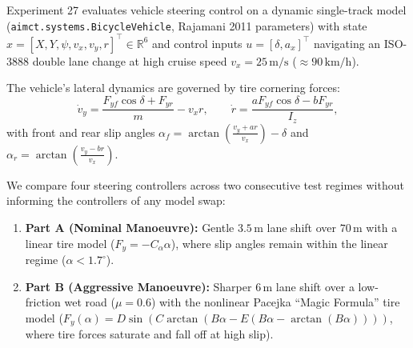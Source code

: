 \documentclass[11pt,a4paper]{article}
\begin{document}
Experiment 27 evaluates vehicle steering control on a dynamic single-track model (\texttt{aimct.systems.BicycleVehicle}, Rajamani 2011 parameters) with state $x = [X, Y, \psi, v_x, v_y, r]^\top \in \mathbb{R}^6$ and control inputs $u = [\delta, a_x]^\top$ navigating an ISO-3888 double lane change at high cruise speed $v_x = 25\,\text{m/s}$ ($\approx 90\,\text{km/h}$).

The vehicle's lateral dynamics are governed by tire cornering forces:
\begin{equation}
\dot v_y = \frac{F_{yf}\cos\delta + F_{yr}}{m} - v_x r, \qquad \dot r = \frac{a F_{yf}\cos\delta - b F_{yr}}{I_z},
\end{equation}
with front and rear slip angles $\alpha_f = \arctan\left(\frac{v_y + a r}{v_x}\right) - \delta$ and $\alpha_r = \arctan\left(\frac{v_y - b r}{v_x}\right)$.

We compare four steering controllers across two consecutive test regimes without informing the controllers of any model swap:
\begin{enumerate}[nosep]
  \item \textbf{Part A (Nominal Manoeuvre):} Gentle $3.5\,\text{m}$ lane shift over $70\,\text{m}$ with a linear tire model ($F_y = -C_\alpha \alpha$), where slip angles remain within the linear regime ($\alpha < 1.7^\circ$).
  \item \textbf{Part B (Aggressive Manoeuvre):} Sharper $6\,\text{m}$ lane shift over a low-friction wet road ($\mu = 0.6$) with the nonlinear Pacejka ``Magic Formula'' tire model ($F_y(\alpha) = D\sin(C\arctan(B\alpha - E(B\alpha - \arctan(B\alpha))))$, where tire forces saturate and fall off at high slip).
\end{enumerate}
\end{document}
